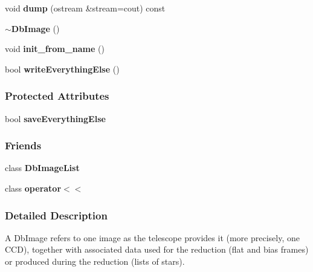 \begin{CompactItemize}
\item 
{}
void {\bf dump} (ostream \&stream=cout) const\label{class_dbimage_a29}

\item 
{}
{\bf $\sim$Db\-Image} ()\label{class_dbimage_a30}

\item 
{}
void {\bf init\_\-from\_\-name} ()\label{class_dbimage_a31}

\item 
{}
bool {\bf write\-Everything\-Else} ()\label{class_dbimage_a32}

\end{CompactItemize}
\subsubsection*{Protected Attributes}
\begin{CompactItemize}
\item 
{}
bool {\bf save\-Everything\-Else}\label{class_dbimage_n0}

\end{CompactItemize}
\subsubsection*{Friends}
\begin{CompactItemize}
\item 
class {\bf Db\-Image\-List}
\item 
class {\bf operator$<$$<$}
\end{CompactItemize}


\subsubsection{Detailed Description}
A Db\-Image refers to one image as the telescope provides it (more precisely, one CCD), together with associated data used for the reduction (flat and bias frames) or produced  during the reduction (lists of stars). 



